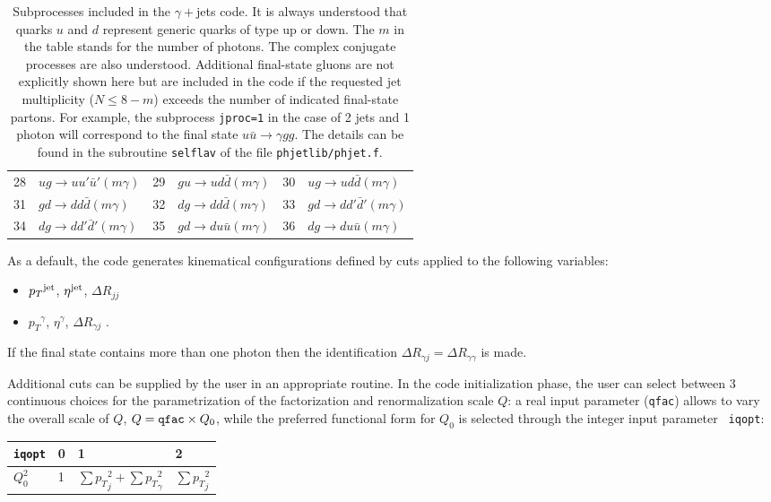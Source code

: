 \documentclass[paper]{JHEP3}
\newcommand{\qu}{u}
\newcommand{\qd}{d}
\newcommand{\qubar}{\bar u}
\newcommand{\qdbar}{\bar d}
\newcommand{\ccaption}[2]{
    \begin{center}
    \parbox{0.85\textwidth}{
      \caption[#1]{\small{{#2}}}
      }
    \end{center}
    }
\def    \ubar   {\bar{u}}
\def    \pt             {\mbox{$p_T$}}
\begin{document}
\begin{table}[h]
\begin{center}
\begin{tabular}{ll|ll|ll}
28 & $\qu g     \to \qu \qu' \qubar' (m\gamma)   $
& 29 & $g \qu   \to \qu \qd  \qdbar (m\gamma)   $
& 30 & $\qu g   \to \qu \qd  \qdbar (m\gamma)   $
\\
31 & $g \qd     \to \qd \qd  \qdbar (m\gamma)   $
& 32 & $\qd g   \to \qd \qd  \qdbar (m\gamma)  $
& 33 & $g \qd   \to \qd \qd' \qdbar' (m\gamma)   $
\\
34 & $\qd g     \to \qd \qd' \qdbar' (m\gamma)   $
& 35 & $g \qd   \to \qd \qu  \qubar (m\gamma)   $
& 36 & $\qd g   \to \qd \qu  \qubar (m\gamma)  $
\end{tabular}
\ccaption{}{\label{tab:gammajets} Subprocesses included in the
  $\gamma+$jets code.  It is always understood that quarks $u$ and
  $d$ represent generic quarks of type up or down. The $m$ in the
  table stands for the number of photons.  
  The complex conjugate processes are also understood.
  Additional final-state gluons are not explicitly shown here but are
  included in the code if the requested jet multiplicity ($N\le 8-m$)
  exceeds the number of indicated final-state partons.  For example,
  the subprocess {\tt jproc=1} in the case of 2  jets and 1 photon will
  correspond to the final state $u\ubar \to \gamma  g g$.  The
  details can be found in the subroutine {\tt selflav} of the file
  {\tt phjetlib/phjet.f}.}
\end{center}
\end{table}

As a default, the code generates kinematical configurations defined by
cuts applied to the following variables:
\begin{itemize}
\item $\pt^{\rm jet}$, $\eta^{\rm jet}$, $\Delta R_{jj}$
\item $\pt^{\gamma}$,  $\eta^{\gamma}$, $\Delta R_{\gamma j}$  . 
\end{itemize}
If the final state contains more than one photon then the identification
$\Delta R_{\gamma j}=\Delta R_{\gamma \gamma}$ is made.

Additional cuts can be supplied by the user in an appropriate routine.
In the code initialization phase, 
the user can select between 3 continuous choices for the parametrization
of the factorization and renormalization scale $Q$: a real input
parameter ({\tt qfac}) allows to vary the overall scale of $Q$,
$Q={\tt qfac}\times Q_0$, while the preferred functional form for
$Q_0$ is selected through the integer input parameter {\tt
  iqopt}:
{\renewcommand{\arraystretch}{1.2}
\begin{center}
\begin{tabular}{l||l|l|l}
{\tt iqopt} & 0 & 1                                  & 2\\  \hline
$Q_0^2$     & 1 & $\sum\pt_{j}^2+\sum\pt_{\gamma}^2$ & $\sum \pt_{j}^2$
\end{tabular}
\end{center}
}
\end{document}
